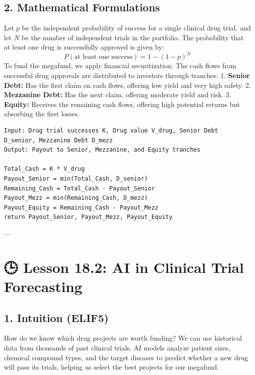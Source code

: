 \documentclass[11pt,oneside]{book}
\begin{document}
\subsection{2. Mathematical Formulations}
Let $p$ be the independent probability of success for a single clinical drug trial, and let $N$ be the number of independent trials in the portfolio. The probability that at least one drug is successfully approved is given by:
$$P(\text{at least one success}) = 1 - (1 - p)^N$$
To fund the megafund, we apply financial securitization. The cash flows from successful drug approvals are distributed to investors through tranches:
1. \textbf{Senior Debt:} Has the first claim on cash flows, offering low yield and very high safety.
2. \textbf{Mezzanine Debt:} Has the next claim, offering moderate yield and risk.
3. \textbf{Equity:} Receives the remaining cash flows, offering high potential returns but absorbing the first losses.

\begin{tcolorbox}[colback=white,colframe=black,boxrule=0.6pt,arc=0mm,title=Megafund Cash Flow Allocation]
\begin{verbatim}
Input: Drug trial successes K, Drug value V_drug, Senior Debt D_senior, Mezzanine Debt D_mezz
Output: Payout to Senior, Mezzanine, and Equity tranches

Total_Cash = K * V_drug
Payout_Senior = min(Total_Cash, D_senior)
Remaining_Cash = Total_Cash - Payout_Senior
Payout_Mezz = min(Remaining_Cash, D_mezz)
Payout_Equity = Remaining_Cash - Payout_Mezz
return Payout_Senior, Payout_Mezz, Payout_Equity
\end{verbatim}
\end{tcolorbox}

---

\section{🕒 Lesson 18.2: AI in Clinical Trial Forecasting}

\subsection{1. Intuition (ELIF5)}
How do we know which drug projects are worth funding? We can use historical data from thousands of past clinical trials. AI models analyze patient sizes, chemical compound types, and the target diseases to predict whether a new drug will pass its trials, helping us select the best projects for our megafund.
\end{document}
